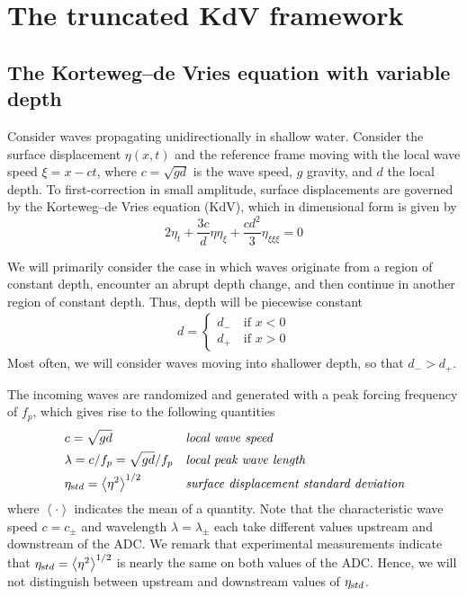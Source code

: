 \documentclass[11pt]{article}
\newcommand{\mean}[1]{\left< #1 \right>}
\newcommand{\freqp}{f_p}
\newcommand{\etastd}{\eta_{\text std}}
\newcommand{\depth}{d}
\newcommand{\dup}{\depth_{-}}
\newcommand{\ddn}{\depth_{+}}
\newcommand{\lam}{\lambda}
\newcommand{\lamupdn}{\lam_{\pm}}
\begin{document}
\section{The truncated KdV framework}

\subsection{The Korteweg–de Vries equation with variable depth}
Consider waves propagating unidirectionally in shallow water. Consider the surface displacement $\eta(x,t)$ and the reference frame moving with the local wave speed $\xi = x - ct$, where $c = \sqrt{g \depth}$ is the wave speed, $g$ gravity, and $\depth$ the local depth.
To first-correction in small amplitude, surface displacements are governed by the Korteweg–de Vries equation (KdV), which in dimensional form is given by
\begin{equation}
2 \eta_t + \frac{3 c}{\depth} \eta \eta_{\xi} + \frac{c \depth^2}{3} \eta_{\xi \xi \xi} = 0
\end{equation}

We will primarily consider the case in which waves originate from a region of constant depth, encounter an abrupt depth change, and then continue in another region of constant depth. Thus, depth will be piecewise constant
\begin{align}
\depth = 
\begin{cases}
\dup \quad \mbox{if } x<0 \\
\ddn \quad \mbox{if } x>0
\end{cases}
\end{align}
Most often, we will consider waves moving into shallower depth, so that $\dup > \ddn$. 

The incoming waves are randomized and generated with a peak forcing frequency of $\freqp$, which gives rise to the following quantities
\begin{align}
&c = \sqrt{g \depth}
&&\mbox{\em local wave speed} \\
&\lam = c/\freqp = \sqrt{g \depth} / \freqp
&&\mbox{\em local peak wave length} \\
&\etastd = \mean{\eta^2}^{1/2} 
&&\mbox{\em surface displacement standard deviation} \\
\end{align}
where $\mean{\cdot}$ indicates the mean of a quantity. 
Note that the characteristic wave speed $c = c_{\pm}$ and wavelength $\lam = \lamupdn$ each take different values upstream and downstream of the ADC. We remark that experimental measurements indicate that $\etastd = \mean{\eta^2}^{1/2}$ is nearly the same on both values of the ADC. Hence, we will not distinguish between upstream and downstream values of $\etastd$.
\end{document}
